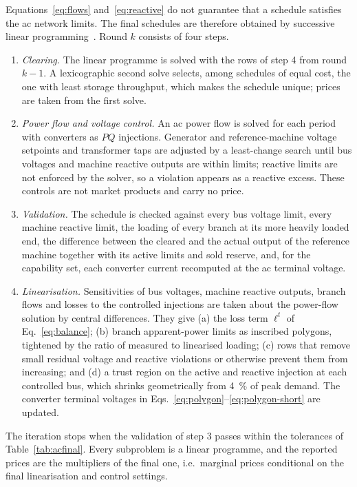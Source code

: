Equations~\eqref{eq:flows} and~\eqref{eq:reactive} do not guarantee that a
schedule satisfies the ac network limits. The final schedules are therefore
obtained by successive linear programming~\cite{alsac1990further,
castillo2016successive}. Round $k$ consists of four steps.
\begin{enumerate}
  \item \emph{Clearing.} The linear programme is solved with the rows of step
        4 from round $k-1$. A lexicographic second solve selects, among
        schedules of equal cost, the one with least storage throughput, which
        makes the schedule unique; prices are taken from the first solve.
  \item \emph{Power flow and voltage control.} An ac power flow is solved for
        each period with converters as $PQ$ injections. Generator and
        reference-machine voltage setpoints and transformer taps are adjusted
        by a least-change search until bus voltages and machine reactive
        outputs are within limits; reactive limits are not enforced by the
        solver, so a violation appears as a reactive excess. These controls
        are not market products and carry no price.
  \item \emph{Validation.} The schedule is checked against every bus voltage
        limit, every machine reactive limit, the loading of every branch at
        its more heavily loaded end, the difference between the cleared and
        the actual output of the reference machine together with its active
        limits and sold reserve, and, for the capability set, each converter
        current recomputed at the ac terminal voltage.
  \item \emph{Linearisation.} Sensitivities of bus voltages, machine reactive
        outputs, branch flows and losses to the controlled injections are
        taken about the power-flow solution by central differences. They
        give (a) the loss term $\ell^t$ of Eq.~\eqref{eq:balance}; (b)
        branch apparent-power limits as inscribed polygons, tightened by the
        ratio of measured to linearised loading; (c) rows that remove small
        residual voltage and reactive violations or otherwise prevent them
        from increasing; and (d) a trust region on the active and reactive
        injection at each controlled bus, which shrinks geometrically from
        \SI{4}{\percent} of peak demand. The converter terminal voltages in
        Eqs.~\eqref{eq:polygon}--\eqref{eq:polygon-short} are updated.
\end{enumerate}
The iteration stops when the validation of step 3 passes within the
tolerances of Table~\ref{tab:acfinal}. Every subproblem is a linear
programme, and the reported prices are the multipliers of the final one, i.e.\
marginal prices conditional on the final linearisation and control settings.

